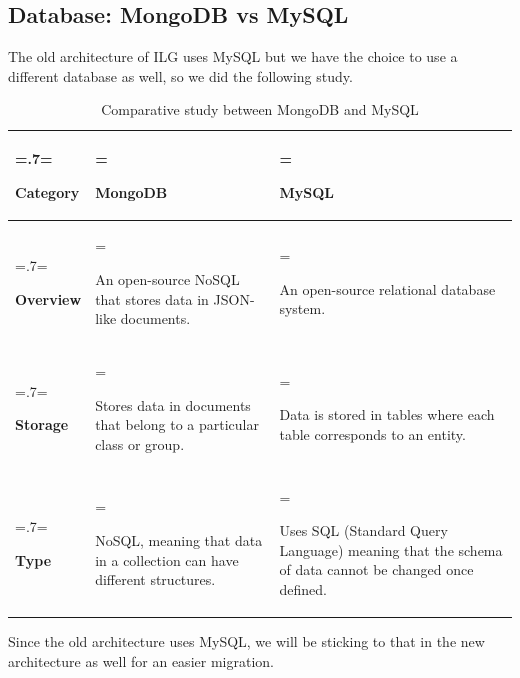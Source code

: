 \subsection{Database: MongoDB vs MySQL}
The old architecture of ILG uses MySQL but we have the choice to use a different database as well, so we did the following study.
\begin{table}[H]
    \renewcommand{\arraystretch}{1.5}%
    \caption{Comparative study between MongoDB and MySQL \cite{mongodb-vs-mysql}}
    \centering
    \medskip
    \begin{tabularx}{1\textwidth} {
            | >{\hsize=.7\hsize\linewidth=\hsize\raggedright\arraybackslash}X
            | >{\hsize=1.15\hsize\linewidth=\hsize\raggedright\arraybackslash}X
            | >{\hsize=1.15\hsize\linewidth=\hsize\raggedright\arraybackslash}X |}
        \hline
        \rowcolor{primary} \textbf {Category} & \textbf {MongoDB}                                                       & \textbf {MySQL}                                                                                    \\
        \hline
        \textbf {Overview}                    & An open-source NoSQL that stores data in JSON-like documents.           & An open-source relational database system.                                                         \\
        \hline
        \textbf {Storage}                     & Stores data in documents that belong to a particular class or group.    & Data is stored in tables where each table corresponds to an entity.                                \\
        \hline
        \textbf {Type}                        & NoSQL, meaning that data in a collection can have different structures. & Uses SQL (Standard Query Language) meaning that the schema of data cannot be changed once defined. \\
        \hline
    \end{tabularx}
\end{table}
Since the old architecture uses MySQL, we will be sticking to that in the new architecture as well for an easier migration.

